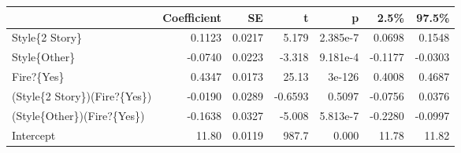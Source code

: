 \begin{tabular}{lrrrrrr}
\toprule
{} &  Coefficient &     SE &       t &        p &    2.5\% &   97.5\% \\
\midrule
Style\{2 Story\}               &       0.1123 & 0.0217 &   5.179 & 2.385e-7 &  0.0698 &  0.1548 \\
Style\{Other\}                 &      -0.0740 & 0.0223 &  -3.318 & 9.181e-4 & -0.1177 & -0.0303 \\
Fire?\{Yes\}                   &       0.4347 & 0.0173 &   25.13 &   3e-126 &  0.4008 &  0.4687 \\
(Style\{2 Story\})(Fire?\{Yes\}) &      -0.0190 & 0.0289 & -0.6593 &   0.5097 & -0.0756 &  0.0376 \\
(Style\{Other\})(Fire?\{Yes\})   &      -0.1638 & 0.0327 &  -5.008 & 5.813e-7 & -0.2280 & -0.0997 \\
Intercept                    &        11.80 & 0.0119 &   987.7 &    0.000 &   11.78 &   11.82 \\
\bottomrule
\end{tabular}
